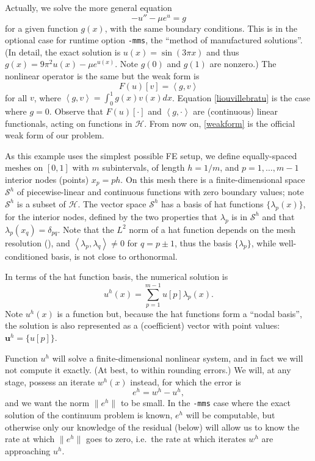 \documentclass[letterpaper,final,12pt,reqno]{amsart}
\newcommand{\bu}{\mathbf{u}}
\newcommand{\ip}[2]{\left<#1,#2\right>}
\begin{document}
Actually, we solve the more general equation
  $$-u'' - \mu e^u = g$$
for a given function $g(x)$, with the same boundary conditions.  This is in the optional case for runtime option \texttt{-mms}, the ``method of manufactured solutions''.  (In detail, the exact solution is $u(x)=\sin(3\pi x)$ and thus $g(x)=9\pi^2 u(x)-\mu e^{u(x)}$.  Note $g(0)$ and $g(1)$ are nonzero.)  The nonlinear operator is the same but the weak form is
\begin{equation}
  F(u)[v] = \ip{g}{v} \label{weakform}
\end{equation}
for all $v$, where $\ip{g}{v} = \int_0^1 g(x) v(x) dx$.  Equation \eqref{liouvillebratu} is the case where $g=0$.  Observe that $F(u)[\cdot]$ and $\ip{g}{\cdot}$ are (continuous) linear functionals, acting on functions in $\mathcal{H}$.  From now on, \eqref{weakform} is the official weak form of our problem.

As this example uses the simplest possible FE setup, we define equally-spaced meshes on $[0,1]$ with $m$ subintervals, of length $h=1/m$, and $p=1,\dots,m-1$ interior nodes (points) $x_p=ph$.  On this mesh there is a finite-dimensional space $\mathcal{S}^h$ of piecewise-linear and continuous functions with zero boundary values; note $\mathcal{S}^h$ is a subset of $\mathcal{H}$.  The vector space $\mathcal{S}^h$ has a basis of hat functions $\{\lambda_p(x)\}$, for the interior nodes, defined by the two properties that $\lambda_p$ is in $\mathcal{S}^h$ and that $\lambda_p(x_q)=\delta_{pq}$.  Note that the $L^2$ norm of a hat function depends on the mesh resolution (), and $\ip{\lambda_p}{\lambda_q}\ne 0$ for $q=p\pm1$, thus the basis $\{\lambda_p\}$, while well-conditioned basis, is not close to orthonormal.

In terms of the hat function basis, the numerical solution is
\begin{equation}
  u^h(x) = \sum_{p=1}^{m-1} u[p] \lambda_p(x).  \label{fesolution}
\end{equation}
Note $u^h(x)$ is a function but, because the hat functions form a ``nodal basis'', the solution is also represented as a (coefficient) vector with point values: $\bu^h =\{u[p]\}$.

Function $u^h$ will solve a finite-dimensional nonlinear system, and in fact we will not compute it exactly.  (At best, to within rounding errors.)  We will, at any stage, possess an iterate $w^h(x)$ instead, for which the error is
\begin{equation}
  e^h = w^h - u^h,  \label{feerror}
\end{equation}
and we want the norm $\|e^h\|$ to be small.  In the \texttt{-mms} case where the exact solution of the continuum problem is known, $e^h$ will be computable, but otherwise only our knowledge of the residual (below) will allow us to know the rate at which $\|e^h\|$ goes to zero, i.e.~the rate at which iterates $w^h$ are approaching $u^h$.
\end{document}

